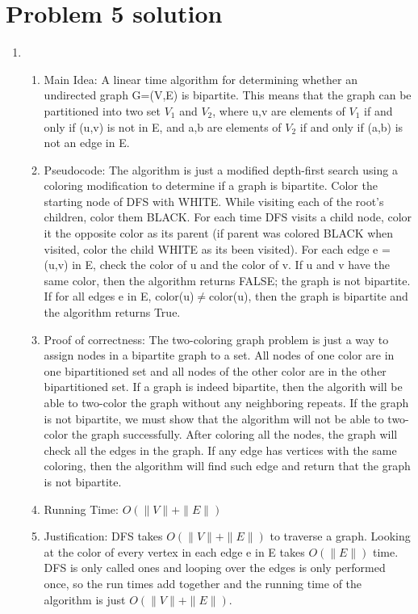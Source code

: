 \documentclass[11pt]{article}
\newenvironment{qparts}{\begin{enumerate}[{(}a{)}]}{\end{enumerate}}
\begin{document}
\section*{Problem 5 solution}
\begin{qparts}
\item \begin{enumerate}
\item Main Idea: A linear time algorithm for determining whether an undirected graph G=(V,E) is bipartite. This means that the graph can be partitioned into two set $V_1$ and $V_2$, where u,v are elements of $V_1$ if and only if (u,v) is not in E, and a,b are elements of $V_2$ if and only if (a,b) is not an edge in E.
\item Pseudocode: The algorithm is just a modified depth-first search using a coloring modification to determine if a graph is bipartite. Color the starting node of DFS with WHITE. While visiting each of the root's children, color them BLACK. For each time DFS visits a child node, color it the opposite color as its parent (if parent was colored BLACK when visited, color the child WHITE as its been visited). For each edge e = (u,v) in E, check the color of u and the color of v. If u and v have the same color, then the algorithm returns FALSE; the graph is not bipartite. If for all edges e in E, color(u)$\neq$color(u), then the graph is bipartite and the algorithm returns True.
\item Proof of correctness: The two-coloring graph problem is just a way to assign nodes in a bipartite graph to a set. All nodes of one color are in one bipartitioned set and all nodes of the other color are in the other bipartitioned set. If a graph is indeed bipartite, then the algorith will be able to two-color the graph without any neighboring repeats. If the graph is not bipartite, we must show that the algorithm will not be able to two-color the graph successfully. After coloring all the nodes, the graph will check all the edges in the graph. If any edge has vertices with the same coloring, then the algorithm will find such edge and return that the graph is not bipartite. 
\item Running Time: $O(\|V\|+\|E\|)$
\item Justification: DFS takes $O(\|V\|+\|E\|)$ to traverse a graph. Looking at the color of every vertex in each edge e in E takes $O(\|E\|)$ time. DFS is only called ones and looping over the edges is only performed once, so the run times add together and the running time of the algorithm is just $O(\|V\|+\|E\|)$.
\end{enumerate}

\end{qparts}
\end{document}
